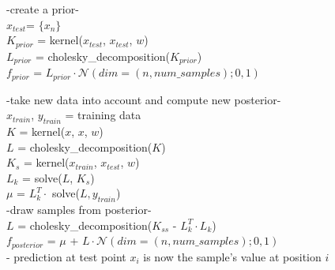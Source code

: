 \documentclass[a4paper,cleardoubleempty,BCOR1cm, 11pt]{report}
\begin{document}
\begin{algorithm}[ht]
\setlength{\leftskip}{4mm}
-create a prior-\\
$x_{test}$= $\lbrace x_n \rbrace$\\
$K_{prior}$ = kernel($x_{test}$, $x_{test}$, $w$)\\
$L_{prior}$ = cholesky\_decomposition($K_{prior}$)\\ %
$f_{prior}$ = $L_{prior} \cdot \mathcal{N}(dim=(n, num\_samples);0,1)$

-take new data into account and compute new posterior-\\
$x_{train}$, $y_{train}$ = training data\\
$K$ = kernel($x$, $x$, $w$)\\
$L$ = cholesky\_decomposition($K$)\\
$K_s$ = kernel($x_{train}$, $x_{test}$, $w$)\\
$L_k$ = solve($L$, $K_s$)\\
$\mu$ = $L_k^T \cdot$ solve($L, y_{train}$)\\

-draw samples from posterior-\\
$L$ = cholesky\_decomposition($K_{ss}$ - $L_k^T \cdot L_k$)\\
$f_{posterior}$ = $\mu$ + $L \cdot \mathcal{N}(dim=(n, num\_samples);0,1)$\\
- prediction at test point $x_i$ is now the sample's value at position $i$
\end{algorithm}
\end{document}
